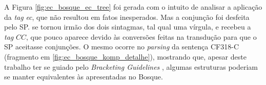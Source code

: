 A Figura \ref{fig:ec_bosque_ec_tree} foi gerada com o intuito de analisar a aplicação da \textit{tag} \textit{ec}, que não resultou em fatos inesperados. Mas a conjunção  foi desfeita pelo SP.  se tornou irmão dos dois sintagmas, tal qual uma vírgula, e recebeu a \textit{tag} $CC$, que pouco aparece devido às conversões feitas na transdução para que o SP aceitasse conjunções. O mesmo ocorre no \textit{parsing} da sentença CF318-C (fragmento em \ref{fig:ec_bosque_komp_detalhe}), mostrando que, apesar deste trabalho ter se guiado pelo \textit{Bracketing Guidelines} \cite{bracketing_ptb}, algumas estruturas poderiam se manter equivalentes às apresentadas no Bosque.
